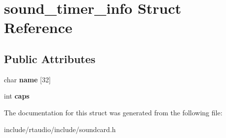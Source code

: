 \hypertarget{structsound__timer__info}{}\section{sound\+\_\+timer\+\_\+info Struct Reference}
\label{structsound__timer__info}
\subsection*{Public Attributes}
\begin{DoxyCompactItemize}
\item 
char {\bfseries name} \mbox{[}32\mbox{]}\hypertarget{structsound__timer__info_a8bf502b479f9b2ffcfc54efe36e84521}{}\label{structsound__timer__info_a8bf502b479f9b2ffcfc54efe36e84521}

\item 
int {\bfseries caps}\hypertarget{structsound__timer__info_a84be613c7f9ed37c25330fc752d6e9f9}{}\label{structsound__timer__info_a84be613c7f9ed37c25330fc752d6e9f9}

\end{DoxyCompactItemize}


The documentation for this struct was generated from the following file\+:\begin{DoxyCompactItemize}
\item 
include/rtaudio/include/soundcard.\+h\end{DoxyCompactItemize}
